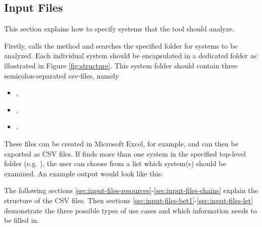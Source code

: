 \subsection{Input Files}
\label{sec:input-files}
This section explains how to specify systems that the tool \Tool should analyze.
\bigskip

Firstly, \Tool calls the method  and searches the specified folder for systems to be analyzed. 
Each individual system should be encapsulated in a dedicated folder as illustrated in Figure \ref{fig:structure}.
This system folder should contain three semicolon-separated csv-files, namely
\begin{itemize}[itemsep=0pt]
	\item {}, 
	\item {}, 
	\item {}. 
\end{itemize}
These files can be created in Microsoft Excel, for example, and can then be exported as CSV files.
If \Tool finds more than one system in the specified top-level folder (e.g. ), the user can choose from a list which system(s) should be examined. 
An example output would look like this:
\begin{tcolorbox}
\small
{}
\end{tcolorbox}

The following sections \ref{sec:input-files-resources}-\ref{sec:input-files-chains} explain the structure of the CSV files. 
Then sections \ref{sec:input-files-bet1}-\ref{sec:input-files-let} demonstrate the three possible types of use cases and which information needs to be filled in.


